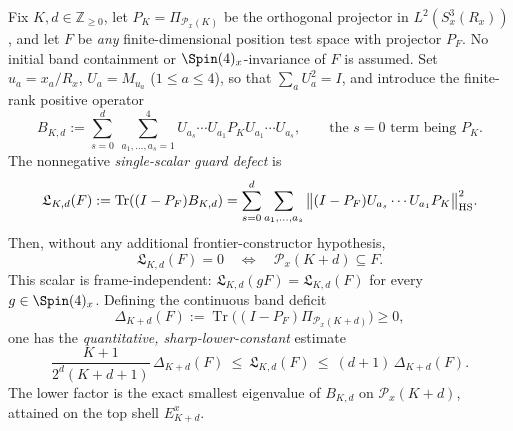 \documentclass[12pt,a4paper]{article}
\begin{document}
\begin{theorem}
\label{p2c:thm:v269-single-scalar-guard}
Fix $K,d\in\mathbb Z_{\ge0}$, let $P_K=\Pi_{\mathcal P_x(K)}$
be the orthogonal projector in $L^2(S^3_x(R_x))$, and let $F$ be
\emph{any} finite-dimensional position test space with projector $P_F$.
No initial band containment or $\Spin(4)_x$-invariance of $F$ is
assumed. Set $u_a=x_a/R_x$, $U_a=M_{u_a}$ ($1\le a\le4$), so that
$\sum_aU_a^2=I$, and introduce the finite-rank positive operator
\[
 B_{K,d}:=\sum_{s=0}^{d}\ \sum_{a_1,\ldots,a_s=1}^{4}
 U_{a_s}\cdots U_{a_1}P_K U_{a_1}\cdots U_{a_s},
 \qquad \text{the $s=0$ term being $P_K$}.
\]
The nonnegative \emph{single-scalar guard defect} is
\[
 \mathfrak L_{K,d}(F):=\operatorname{Tr}((I-P_F)B_{K,d})
 =\sum_{s=0}^{d}\sum_{a_1,\ldots,a_s}
 \big\|(I-P_F)U_{a_s}\cdots U_{a_1}P_K\big\|_{\rm HS}^{2}.
\]
Then, without any additional frontier-constructor hypothesis,
\[
 \boxed{\quad \mathfrak L_{K,d}(F)=0
 \quad\Longleftrightarrow\quad \mathcal P_x(K+d)\subseteq F.\quad}
\]
This scalar is frame-independent:
$\mathfrak L_{K,d}(gF)=\mathfrak L_{K,d}(F)$ for every
$g\in\Spin(4)_x$. Defining the continuous band deficit
\[
 \Delta_{K+d}(F):=\operatorname{Tr}
 \bigl((I-P_F)\Pi_{\mathcal P_x(K+d)}\bigr)\ge0,
\]
one has the \emph{quantitative, sharp-lower-constant} estimate
\[
 \boxed{\quad
 \frac{K+1}{2^d(K+d+1)}\,\Delta_{K+d}(F)
 \ \le\ \mathfrak L_{K,d}(F)
 \ \le\ (d+1)\,\Delta_{K+d}(F).\quad}
\]
The lower factor is the exact smallest eigenvalue of $B_{K,d}$ on
$\mathcal P_x(K+d)$, attained on the top shell $E_{K+d}^x$.
\end{theorem}
\end{document}
